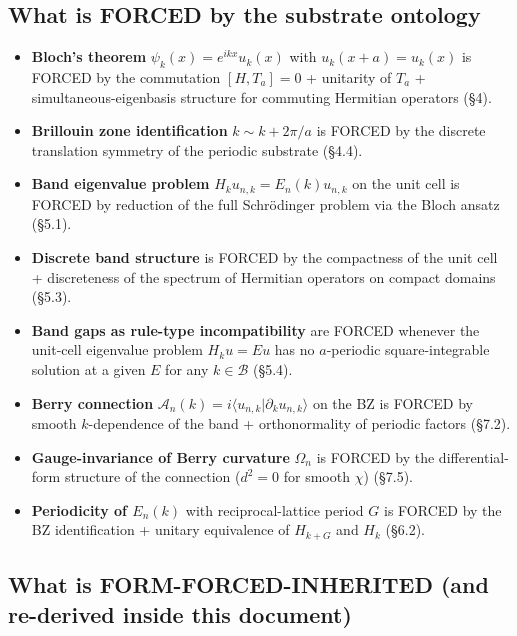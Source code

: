 \documentclass[11pt,a4paper]{article}
\begin{document}
\subsection*{What is FORCED by the substrate ontology}

\begin{itemize}[noitemsep]
  \item \textbf{Bloch's theorem} $\psi_k(x) = e^{ikx}u_k(x)$ with $u_k(x+a) = u_k(x)$ is FORCED by the commutation $[H, T_a] = 0$ + unitarity of $T_a$ + simultaneous-eigenbasis structure for commuting Hermitian operators (\S4).
  \item \textbf{Brillouin zone identification} $k \sim k + 2\pi/a$ is FORCED by the discrete translation symmetry of the periodic substrate (\S4.4).
  \item \textbf{Band eigenvalue problem} $H_k u_{n,k} = E_n(k)u_{n,k}$ on the unit cell is FORCED by reduction of the full Schr\"odinger problem via the Bloch ansatz (\S5.1).
  \item \textbf{Discrete band structure} is FORCED by the compactness of the unit cell + discreteness of the spectrum of Hermitian operators on compact domains (\S5.3).
  \item \textbf{Band gaps as rule-type incompatibility} are FORCED whenever the unit-cell eigenvalue problem $H_k u = E u$ has no $a$-periodic square-integrable solution at a given $E$ for any $k \in \mathcal{B}$ (\S5.4).
  \item \textbf{Berry connection} $\mathcal{A}_n(k) = i\langle u_{n,k}|\partial_k u_{n,k}\rangle$ on the BZ is FORCED by smooth $k$-dependence of the band + orthonormality of periodic factors (\S7.2).
  \item \textbf{Gauge-invariance of Berry curvature} $\Omega_n$ is FORCED by the differential-form structure of the connection ($d^2 = 0$ for smooth $\chi$) (\S7.5).
  \item \textbf{Periodicity of $E_n(k)$} with reciprocal-lattice period $G$ is FORCED by the BZ identification + unitary equivalence of $H_{k+G}$ and $H_k$ (\S6.2).
\end{itemize}

\subsection*{What is FORM-FORCED-INHERITED (and re-derived inside this document)}
\end{document}
